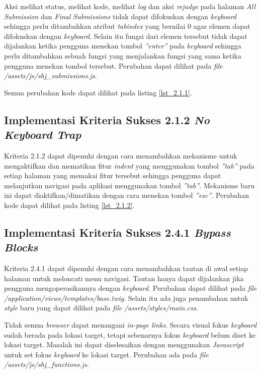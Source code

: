 \begin{itemize}
	Aksi melihat status, melihat kode, melihat \textit{log} dan aksi \textit{rejudge} pada halaman \textit{All Submission} dan \textit{Final Submissions} tidak dapat difokuskan dengan \textit{keyboard} sehingga perlu ditambahkan atribut \textit{tabindex} yang bernilai 0 agar elemen dapat difokuskan dengan \textit{keyboard}. Selain itu fungsi dari elemen tersebut tidak dapat dijalankan ketika pengguna menekan tombol \textit{''enter''} pada \textit{keyboard} sehingga perlu ditambahkan sebuah fungsi yang menjalankan fungsi yang sama ketika pengguna menekan tombol tersebut. Perubahan dapat dilihat pada \textit{file} \textit{/assets/js/shj\_submissions.js}.

\end{itemize}

Semua perubahan kode dapat dilihat pada listing \ref{lst_2.1.1}.

\subsection{Implementasi Kriteria Sukses 2.1.2 \textit{No \textit{Keyboard} Trap}}
\label{subsec:implementasi_A_2.1.2}

Kriteria 2.1.2 dapat dipenuhi dengan cara menambahkan mekanisme untuk mengaktifkan dan mematikan fitur \textit{indent} yang menggunakan tombol \textit{''tab''} pada setiap halaman yang memakai fitur tersebut sehingga pengguna dapat melanjutkan navigasi pada aplikasi menggunakan tombol \textit{''tab''}. Mekanisme baru ini dapat diaktifkan/dimatikan dengan cara menekan tombol \textit{''esc''}. Perubahan kode dapat dilihat pada listing \ref{lst_2.1.2}.

\subsection{Implementasi Kriteria Sukses 2.4.1 \textit{Bypass Blocks}}
\label{subsec:implementasi_A_2.4.1}

Kriteria 2.4.1 dapat dipenuhi dengan cara menambahkan tautan di awal setiap halaman untuk meloncati menu navigasi. Tautan hanya dapat dijalankan jika pengguna mengoperasikannya dengan \textit{keyboard}. Perubahan dapat dilihat pada \textit{file} \textit{/application/views/templates/base.twig}. Selain itu ada juga penambahan untuk \textit{style} baru yang dapat dilihat pada \textit{file} \textit{/assets/styles/main.css}.

Tidak semua \textit{browser} dapat menangani \textit{in-page links}. Secara visual fokus \textit{keyboard} sudah berada pada lokasi target, tetapi sebenarnya fokus \textit{keyboard} belum diset ke lokasi target. Masalah ini dapat diselesaikan dengan menggunakan \textit{Javascript} untuk set fokus \textit{keyboard} ke lokasi target. Perubahan ada pada \textit{file} \textit{/assets/js/shj\_functions.js}.

